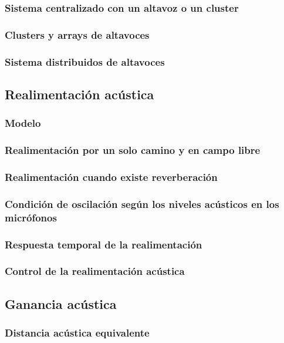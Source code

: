 \documentclass[a4paper, 8pt]{extarticle}
\begin{document}
\begin{multicols}{3}
  \subsubsection{Sistema centralizado con un altavoz o un cluster}
  \subsubsection{Clusters y arrays de altavoces}
  \subsubsection{Sistema distribuidos de altavoces}

  \subsection{Realimentación acústica}
  \subsubsection{Modelo}
  \subsubsection{Realimentación por un solo camino y en campo libre}
  \subsubsection{Realimentación cuando existe reverberación}
  \subsubsection{Condición de oscilación según los niveles acústicos en los micrófonos}
  \subsubsection{Respuesta temporal de la realimentación}
  \subsubsection{Control de la realimentación acústica}

  \subsection{Ganancia acústica}
  \subsubsection{Distancia acústica equivalente}

\end{multicols}
\end{document}
